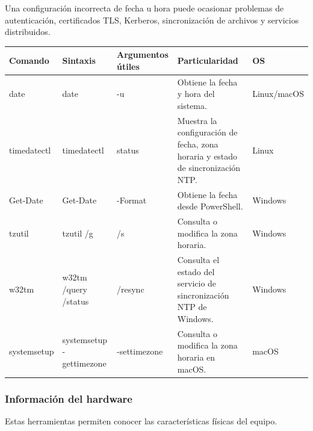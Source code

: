 \documentclass[a4paper,10pt]{article}
\begin{document}
Una configuración incorrecta de fecha u hora puede ocasionar problemas de
autenticación, certificados TLS, Kerberos, sincronización de archivos y
servicios distribuidos.

\begin{longtable}{|p{2.8cm}|p{3.1cm}|p{4.3cm}|p{5.5cm}|p{1.5cm}|}

\hline
Comando &
Sintaxis &
Argumentos útiles &
Particularidad &
OS
\\
\hline
\endhead

date &
date &
-u &
Obtiene la fecha y hora del sistema. &
Linux/macOS
\\
\hline

timedatectl &
timedatectl &
status &
Muestra la configuración de fecha, zona horaria y estado de sincronización NTP. &
Linux
\\
\hline

Get-Date &
Get-Date &
-Format &
Obtiene la fecha desde PowerShell. &
Windows
\\
\hline

tzutil &
tzutil /g &
/s &
Consulta o modifica la zona horaria. &
Windows
\\
\hline

w32tm &
w32tm /query /status &
/resync &
Consulta el estado del servicio de sincronización NTP de Windows. &
Windows
\\
\hline

systemsetup &
systemsetup -gettimezone &
-settimezone &
Consulta o modifica la zona horaria en macOS. &
macOS
\\
\hline

\end{longtable}


\subsubsection{Información del hardware}

Estas herramientas permiten conocer las características físicas del equipo.
\end{document}
